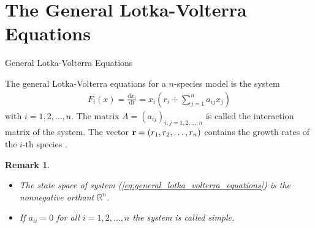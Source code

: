 \documentclass[10pt, dvipsnames]{beamer}
\newtheorem*{remark}{Remark}
\begin{document}
\section[General System]{The General Lotka-Volterra Equations}
\begin{frame}{General Lotka-Volterra Equations}

\begin{definition}
    The general Lotka-Volterra equations for a $n$-species model is the system
    \begin{align}\label{eq:general_lotka_volterra_equations}
        F_i(x) = \frac{\mathrm{d}x_i}{\mathrm{d}t} = x_i \left(r_i + \sum_{j = 1}^{n}a_{ij} x_j \right)
    \end{align}
    with $i = 1, 2, \ldots, n$. The matrix $A = (a_{ij})_{i, j = 1, 2, \ldots, n}$ is called the interaction matrix of the system. The vector $\vectorbold{r} = (r_1, r_2, \ldots, r_n)$ contains the growth rates of the $i$-th species \cite[12, 64 \psq]{10.25365/thesis.45530, Volterra1931}.
\end{definition}\pause

\begin{remark}
    \begin{itemize}
        \item The state space of system (\ref{eq:general_lotka_volterra_equations}) is the nonnegative orthant $\mathbb{R}^n$.
        \item If $a_{ii} = 0$ for all $i = 1, 2, \ldots, n$ the system is called simple.
    \end{itemize}
\end{remark}
    
\end{frame}
\end{document}
